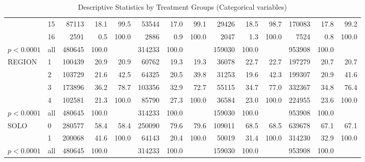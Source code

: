 \begin{table}[ht]
{\begin{tabular}{ll|rrr|rrr|rrr|rrr}
   & 15 & 87113 & 18.1 & 99.5 & 53544 & 17.0 & 99.1 & 29426 & 18.5 & 98.7 & 170083 & 17.8 & 99.2 \\ 
   & 16 & 2591 & 0.5 & 100.0 & 2886 & 0.9 & 100.0 & 2047 & 1.3 & 100.0 & 7524 & 0.8 & 100.0 \\ 
   \hline
$p< 0.0001$ & all & 480645 & 100.0 &  & 314233 & 100.0 &  & 159030 & 100.0 &  & 953908 & 100.0 &  \\ 
   \hline
\hline
REGION & 1 & 100439 & 20.9 & 20.9 & 60762 & 19.3 & 19.3 & 36078 & 22.7 & 22.7 & 197279 & 20.7 & 20.7 \\ 
   & 2 & 103729 & 21.6 & 42.5 & 64325 & 20.5 & 39.8 & 31253 & 19.6 & 42.3 & 199307 & 20.9 & 41.6 \\ 
   & 3 & 173896 & 36.2 & 78.7 & 103356 & 32.9 & 72.7 & 55115 & 34.7 & 77.0 & 332367 & 34.8 & 76.4 \\ 
   & 4 & 102581 & 21.3 & 100.0 & 85790 & 27.3 & 100.0 & 36584 & 23.0 & 100.0 & 224955 & 23.6 & 100.0 \\ 
   \hline
$p< 0.0001$ & all & 480645 & 100.0 &  & 314233 & 100.0 &  & 159030 & 100.0 &  & 953908 & 100.0 &  \\ 
   \hline
\hline
SOLO & 0 & 280577 & 58.4 & 58.4 & 250090 & 79.6 & 79.6 & 109011 & 68.5 & 68.5 & 639678 & 67.1 & 67.1 \\ 
   & 1 & 200068 & 41.6 & 100.0 & 64143 & 20.4 & 100.0 & 50019 & 31.4 & 100.0 & 314230 & 32.9 & 100.0 \\ 
   \hline
$p< 0.0001$ & all & 480645 & 100.0 &  & 314233 & 100.0 &  & 159030 & 100.0 &  & 953908 & 100.0 &  \\ 
   \hline
\hline
\end{tabular}
}
\caption{Descriptive Statistics by Treatment Groups (Categorical variables)} 
\label{tab:descriptive.1}
\end{table}

